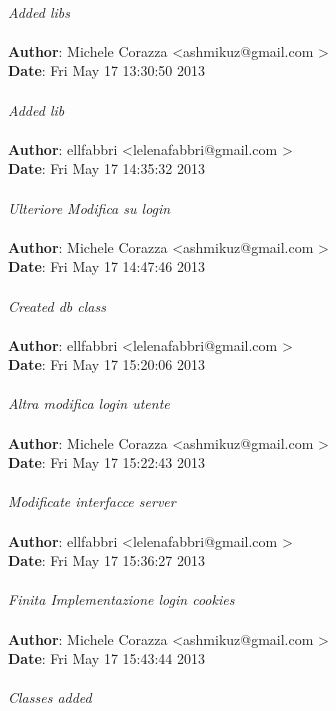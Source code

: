 \documentclass[a4paper,12pt]{article} %
\begin{document}
\\
    \emph{Added libs}\\
\\
\textbf{Author}: Michele Corazza \textless ashmikuz@gmail.com \textgreater \\
\textbf{Date}:   Fri May 17 13:30:50 2013 \\
\\
    \emph{Added lib}\\
\\
\textbf{Author}: ellfabbri \textless lelenafabbri@gmail.com \textgreater \\
\textbf{Date}:   Fri May 17 14:35:32 2013 \\
\\
    \emph{Ulteriore Modifica su login}\\
\\
\textbf{Author}: Michele Corazza \textless ashmikuz@gmail.com \textgreater \\
\textbf{Date}:   Fri May 17 14:47:46 2013 \\
\\
    \emph{Created db class}\\
\\
\textbf{Author}: ellfabbri \textless lelenafabbri@gmail.com \textgreater \\
\textbf{Date}:   Fri May 17 15:20:06 2013 \\
\\
    \emph{Altra modifica login utente}\\
\\
\textbf{Author}: Michele Corazza \textless ashmikuz@gmail.com \textgreater \\
\textbf{Date}:   Fri May 17 15:22:43 2013 \\
\\
    \emph{Modificate interfacce server}\\
\\
\textbf{Author}: ellfabbri \textless lelenafabbri@gmail.com \textgreater \\
\textbf{Date}:   Fri May 17 15:36:27 2013 \\
\\
    \emph{Finita Implementazione login cookies}\\
\\
\textbf{Author}: Michele Corazza \textless ashmikuz@gmail.com \textgreater \\
\textbf{Date}:   Fri May 17 15:43:44 2013 \\
\\
    \emph{Classes added}\\
\end{document}
